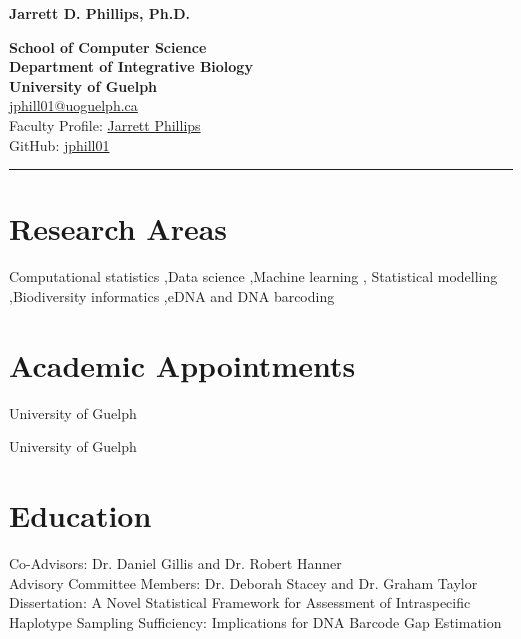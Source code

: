 \begin{center}
  {\fontsize{19}{22.8}\selectfont\bfseries Jarrett D. Phillips, Ph.D.\par}
  \vspace{0.3\baselineskip}
  \textbf{School of Computer Science}\\
  \textbf{Department of Integrative Biology}\\
  \textbf{University of Guelph}\\
  \href{mailto:jphill01@uoguelph.ca}{jphill01@uoguelph.ca}\\
  Faculty Profile: \href{https://www.uoguelph.ca/profile/jarrett-phillips}{Jarrett Phillips}\\
  GitHub: \href{https://jphill01.github.io/}{jphill01}
\end{center}
\vspace{-0.4\baselineskip}
\noindent\rule{\linewidth}{0.5pt}

\section{Research Areas}
Computational statistics \sep Data science \sep Machine learning \sep
Statistical modelling \sep Biodiversity informatics \sep eDNA and DNA barcoding

\section{Academic Appointments}
University of Guelph

\smallskip
{}
University of Guelph

\section{Education}
Co-Advisors: Dr. Daniel Gillis and Dr. Robert Hanner\\
Advisory Committee Members: Dr. Deborah Stacey and Dr. Graham Taylor\\
Dissertation: A Novel Statistical Framework for Assessment of Intraspecific
Haplotype Sampling Sufficiency: Implications for DNA Barcode Gap
Estimation


